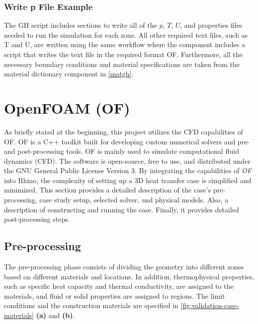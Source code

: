 \subsubsection{Write p File Example}
The \gls{GH} script includes sections to write all of the $p$, $T$, $U$, and properties files needed to run the simulation for each zone. All other required text files, such as T and U, are written using the same workflow where the component includes a script that writes the text file in the required format \gls{OF}. Furthermore, all the necessary boundary conditions and material specifications are taken from the material dictionary component in \cref{matgh}.


















\section[OpenFOAM]{OpenFOAM (OF)}
As briefly stated at the beginning, this project utilizes the CFD capabilities of \gls{OF}.  \gls{OF} is a C++ toolkit built for developing custom numerical solvers and pre- and post-processing tools. \gls{OF} is mainly used to simulate computational fluid dynamics (CFD). The software is open-source, free to use, and distributed under the GNU General Public License Version 3.
By integrating the capabilities of \textit{OF} into Rhino, the complexity of setting up a 3D heat transfer case is simplified and minimized.
This section provides a detailed description of the case's pre-processing, case study setup, selected solver, and physical models. Also, a description of constructing and running the case. Finally, it provides detailed post-processing steps.



\subsection{Pre-processing}
The pre-processing phase consists of dividing the geometry into different zones based on different materials and locations. In addition, thermophysical properties, such as specific heat capacity and thermal conductivity, are assigned to the materials, and fluid or solid properties are assigned to regions. The limit conditions and the construction materials are specified in \cref{fig:validation-case-materials} \textbf{(a)} and \textbf{(b)}. 


